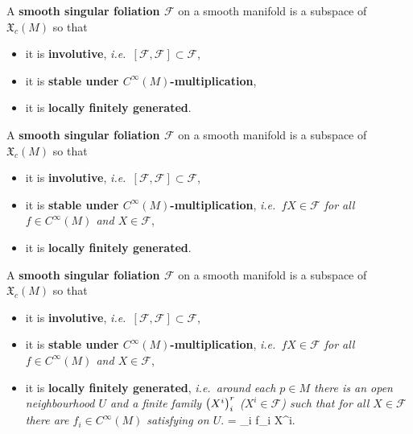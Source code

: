 \documentclass[hyperref={pdfpagelabels=false}]{beamer}
\def\bas#1\eas{\begin{align*}#1\end{align*}}
\theoremstyle{plain}
\theoremstyle{remark}
\begin{document}
\begin{frame}
\begin{definition}
A \textbf{smooth singular foliation $\mathcal{F}$} on a smooth manifold is a subspace of $\mathfrak{X}_c(M)$ so that
\begin{itemize}
	\item it is \textbf{involutive}, \textit{i.e.\ $[\mathcal{F}, \mathcal{F}] \subset \mathcal{F}$},
	\item it is \textbf{stable under $C^\infty(M)$-multiplication},
	\item it is \textbf{locally finitely generated}.
\end{itemize}
\end{definition}
\end{frame}

\begin{frame}
\begin{definition}
A \textbf{smooth singular foliation $\mathcal{F}$} on a smooth manifold is a subspace of $\mathfrak{X}_c(M)$ so that
\begin{itemize}
	\item it is \textbf{involutive}, \textit{i.e.\ $[\mathcal{F}, \mathcal{F}] \subset \mathcal{F}$},
	\item it is \textbf{stable under $C^\infty(M)$-multiplication}, \textit{i.e.\ $fX \in \mathcal{F}$ for all $f \in C^\infty(M)$ and $X \in \mathcal{F}$},
	\item it is \textbf{locally finitely generated}.
\end{itemize}
\end{definition}
\end{frame}

\begin{frame}
\begin{definition}
A \textbf{smooth singular foliation $\mathcal{F}$} on a smooth manifold is a subspace of $\mathfrak{X}_c(M)$ so that
\begin{itemize}
	\item it is \textbf{involutive}, \textit{i.e.\ $[\mathcal{F}, \mathcal{F}] \subset \mathcal{F}$},
	\item it is \textbf{stable under $C^\infty(M)$-multiplication}, \textit{i.e.\ $fX \in \mathcal{F}$ for all $f \in C^\infty(M)$ and $X \in \mathcal{F}$},
	\item it is \textbf{locally finitely generated}, \textit{i.e.\ around each $p \in M$ there is an open neighbourhood $U$ and a finite family $\mleft( X^i \mright)_i^{r}$ ($X^i \in \mathcal{F}$) such that for all $X \in \mathcal{F}$ there are $f_i \in C^\infty(M)$ satisfying on $U$}.
	\bas
	X = \sum_i f_i X^i.
	\eas
\end{itemize}
\end{definition}
\end{frame}
\end{document}
